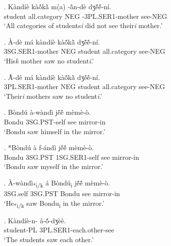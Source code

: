 \documentclass{assets/fieldnotes}
\begin{document}
\exg. K\`{a}nd\'{i}\`{e} k\`{a}ṍkã̀ m(a) -ã̀n-d\`{e} dʒẽ́ẽ́-n\'{i}. \\
student all.category NEG -3PL.SER1-mother see-NEG \\
`All categories of students\textit{\scriptsize{i}} did not see their\textit{\scriptsize{i}} mother.'  

\exg. \`{A}-d\`{e} m\'{a} k\`{a}nd\'{i}\`{e} k\`{a}ṍkã̀  dʒẽ́ẽ́-n\'{i}. \\
3SG.SER1-mother NEG student all.category see-NEG \\
`His\textit{\scriptsize{k}} mother saw no student\textit{\scriptsize{i}}.'

\exg. Ã̀-d\^{e} m\'{a} k\`{a}nd\'{i}\`{e} k\`{a}ṍkã̀  dʒẽ́ẽ́-n\'{i}. \\
3PL.SER1-mother NEG student all.category see-NEG \\
`Their\textit{\scriptsize{i}} mothers saw no student\textit{\scriptsize{i}}.'

 \newline


\exg. B\`{o}nd\'{u} \`{a}-w\`{a}nd\`{i} jẽ́ẽ́ m\`{e}m\`{e}-\`{o}. \\
Bondu 3SG.PST-self see mirror-in \\
`Bondu saw himself in the mirror.'

\exg. *B\`{o}nd\'{u} \`{a} f-\'{a}nd\`{i} jẽ́ẽ́ m\`{e}m\`{e}-\`{o}. \\
Bondu 3SG.PST 1SG.SER1-self see mirror-in \\
`Bondu saw myself in the mirror.'  

\exg. \`{A}-w\`{a}nd\`{i}\textsubscript{*i/k} \'{a} B\`{o}nd\'{u}\textsubscript{i} jẽ́ẽ́ m\`{e}m\`{e}-\`{o}. \\
3SG.self 3SG.PST Bondu see mirror-in \\
`He\textsubscript{*i/k} saw Bondu\textsubscript{i} in the mirror.' 


\exg. K\`{a}nd\'{i}\`{e}-n- \^{a}-\textipa{\textltailn}ṍ-dʒ\`{e}\`{e}. \\
student-PL 3PL.SER1-each.other-see \\
`The students saw each other.'
\end{document}
